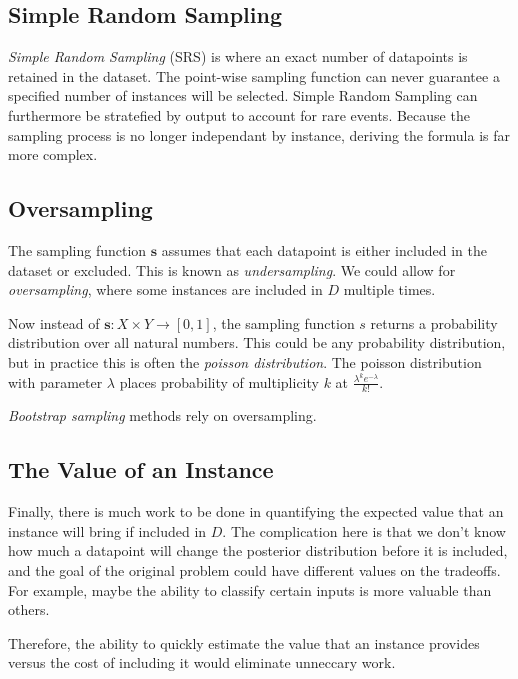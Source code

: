 \documentclass[twoside]{article}
\begin{document}
\subsection{Simple Random Sampling}

\textit{Simple Random Sampling} (SRS) is where an exact number of datapoints is retained in the dataset. The point-wise sampling function can never guarantee a specified number of instances will be selected. Simple Random Sampling can furthermore be stratefied by output to account for rare events. Because the sampling process is no longer independant by instance, deriving the formula is far more complex.

\subsection{Oversampling}

The sampling function \(\mathbf{s}\) assumes that each datapoint is either included in the dataset or excluded. This is known as \textit{undersampling}. We could allow for \textit{oversampling}, where some instances are included in \(D\) multiple times.

Now instead of \(\mathbf{s}: X \times Y \rightarrow \left [ 0, 1\right ]\), the sampling function \(s\) returns a probability distribution over all natural numbers. This could be any probability distribution, but in practice this is often the \textit{poisson distribution}. The poisson distribution with parameter \(\lambda\) places probability of multiplicity \(k\) at \(\frac{\lambda^k e^{-\lambda}}{k!}\).

\textit{Bootstrap sampling} methods rely on oversampling.

\subsection{The Value of an Instance}

Finally, there is much work to be done in quantifying the expected value that an instance will bring if included in \(D\). The complication here is that we don't know how much a datapoint will change the posterior distribution before it is included, and the goal of the original problem could have different values on the tradeoffs. For example, maybe the ability to classify certain inputs is more valuable than others.

Therefore, the ability to quickly estimate the value that an instance provides versus the cost of including it would eliminate unneccary work.
\end{document}
